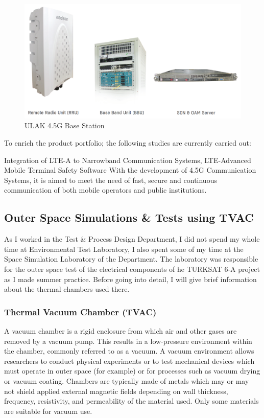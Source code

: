\begin{figure}[H]
	\center
	\setlength{\unitlength}{\textwidth} 
	\includegraphics[width=1.0\unitlength]{ulak}
	\caption{\label{fig:ulak}ULAK 4.5G Base Station\cite{ulak} }
\end{figure}	
	
	To enrich the product portfolio; the following studies are currently carried out:

	Integration of LTE-A to Narrowband Communication Systems,
LTE-Advanced Mobile Terminal Safety Software  
With the development of 4.5G Communication Systems, it is aimed to meet the need of fast, secure and continuous communication of both mobile operators and public institutions\cite{ulak}.


\vfill


\subsection{Outer Space Simulations \& Tests using TVAC  }
\- \indent
	As I worked in the Test \& Process Design Department, I did not spend my whole time at Environmental Test Laboratory, I also spent some of my time at the Space Simulation Laboratory of the Department. The laboratory was responsible for the outer space test of the electrical components of he TURKSAT 6-A project as I made summer practice. Before going into detail, I will give brief information about the thermal chambers used there.
	
\subsubsection{Thermal Vacuum Chamber (TVAC) }
\- \indent
	A vacuum chamber is a rigid enclosure from which air and other gases are removed by a vacuum pump. This results in a low-pressure environment within the chamber, commonly referred to as a vacuum. A vacuum environment allows researchers to conduct physical experiments or to test mechanical devices which must operate in outer space (for example) or for processes such as vacuum drying or vacuum coating. Chambers are typically made of metals which may or may not shield applied external magnetic fields depending on wall thickness, frequency, resistivity, and permeability of the material used. Only some materials are suitable for vacuum use\cite{tvac}.


